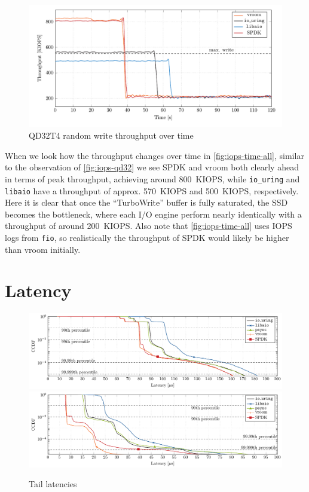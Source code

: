 \begin{figure}
  \centering
    \includegraphics[width=\textwidth]{figures/iops-time-tmp}
    \caption{QD32T4 random write throughput over time}
    \label{fig:iops-time-all}
\end{figure}

When we look how the throughput changes over time in \autoref{fig:iops-time-all}, similar to the observation of \autoref{fig:iops-qd32} we see SPDK and vroom both clearly ahead in terms of peak throughput, achieving around \qty{800}{KIOPS}, while \texttt{io\_uring} and \texttt{libaio} have a throughput of approx. \qty{570}{KIOPS} and \qty{500}{KIOPS}, respectively. Here it is clear that once the ``TurboWrite'' buffer is fully saturated, the SSD becomes the bottleneck, where each I/O engine perform nearly identically with a throughput of around \qty{200}{KIOPS}. Also note that \autoref{fig:iops-time-all} uses IOPS logs from \texttt{fio}, so realistically the throughput of SPDK would likely be higher than vroom initially.

\section{Latency}
\begin{figure}
  \centering
   {\includegraphics[width=\textwidth]{figures/latency-ccdf-read} \label{fig:ccdf-read}}
   {\includegraphics[width=\textwidth]{figures/latency-ccdf-write} \label{fig:ccdf-write}}
  \caption{Tail latencies}
  \label{fig:ccdf}
\end{figure}

